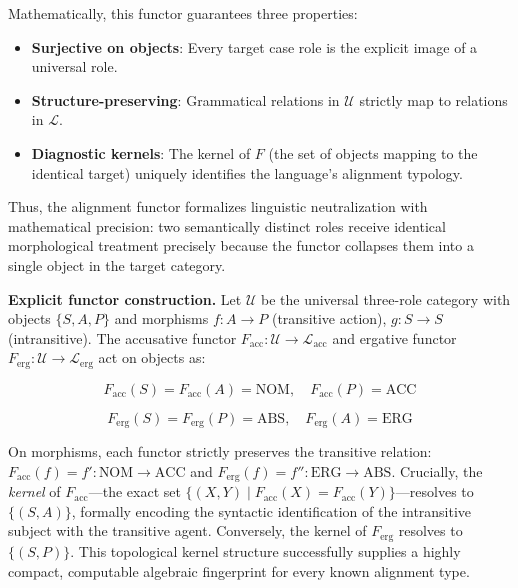 \documentclass[
]{article}
\providecommand{\tightlist}{%
  \setlength{\itemsep}{0pt}\setlength{\parskip}{0pt}}
\begin{document}
Mathematically, this functor guarantees three properties:

\begin{itemize}
\tightlist
\item
  \textbf{Surjective on objects}: Every target case role is the explicit
  image of a universal role.
\item
  \textbf{Structure-preserving}: Grammatical relations in
  \(\mathcal{U}\) strictly map to relations in \(\mathcal{L}\).
\item
  \textbf{Diagnostic kernels}: The kernel of \(F\) (the set of objects
  mapping to the identical target) uniquely identifies the language's
  alignment typology.
\end{itemize}

Thus, the alignment functor formalizes linguistic neutralization with
mathematical precision: two semantically distinct roles receive
identical morphological treatment precisely because the functor
collapses them into a single object in the target category.

\textbf{Explicit functor construction.} Let \(\mathcal{U}\) be the
universal three-role category with objects \(\{S, A, P\}\) and morphisms
\(f\colon A \to P\) (transitive action), \(g\colon S \to S\)
(intransitive). The accusative functor
\(F_{\text{acc}}\colon \mathcal{U} \to \mathcal{L}_{\text{acc}}\) and
ergative functor
\(F_{\text{erg}}\colon \mathcal{U} \to \mathcal{L}_{\text{erg}}\) act on
objects as:

\begin{equation}
F_{\text{acc}}(S) = F_{\text{acc}}(A) = \text{NOM}, \quad F_{\text{acc}}(P) = \text{ACC}
\label{eq:eq-2-3}
\end{equation}

\begin{equation}
F_{\text{erg}}(S) = F_{\text{erg}}(P) = \text{ABS}, \quad F_{\text{erg}}(A) = \text{ERG}
\label{eq:eq-2-4}
\end{equation}

On morphisms, each functor strictly preserves the transitive relation:
\(F_{\text{acc}}(f) = f'\colon \text{NOM} \to \text{ACC}\) and
\(F_{\text{erg}}(f) = f''\colon \text{ERG} \to \text{ABS}\). Crucially,
the \emph{kernel} of \(F_{\text{acc}}\)---the exact set
\(\{(X,Y) \mid F_{\text{acc}}(X) = F_{\text{acc}}(Y)\}\)---resolves to
\(\{(S,A)\}\), formally encoding the syntactic identification of the
intransitive subject with the transitive agent. Conversely, the kernel
of \(F_{\text{erg}}\) resolves to \(\{(S,P)\}\). This topological kernel
structure successfully supplies a highly compact, computable algebraic
fingerprint for every known alignment type.
\end{document}
